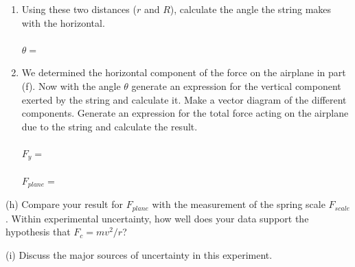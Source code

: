 \begin{enumerate}
\item Using these two distances ($r$ and $R$), 
calculate the angle the string makes with
the horizontal. \\
\\
\( \theta  =\)  \vspace{5mm}

\item We determined the horizontal component of the force on the airplane in part
(f). Now with the angle \( \theta \) generate an expression for the vertical component
exerted by the string and calculate it. Make a vector diagram of the different
components. Generate an expression for the total force acting on the airplane
due to the string and calculate the result. \\
\\
\( F_{y} =\)  \\
\\
\( F_{plane} =\)  \vspace{10mm}

\end{enumerate}
(h) Compare your result for \( F_{plane} \) with the measurement of the spring
scale \( F_{scale} \). Within experimental uncertainty, how well does your
data support the hypothesis that \( F_{c}  =mv^{2} /r \)? 
\vspace{20mm}

(i) Discuss the major sources of uncertainty in this experiment.

